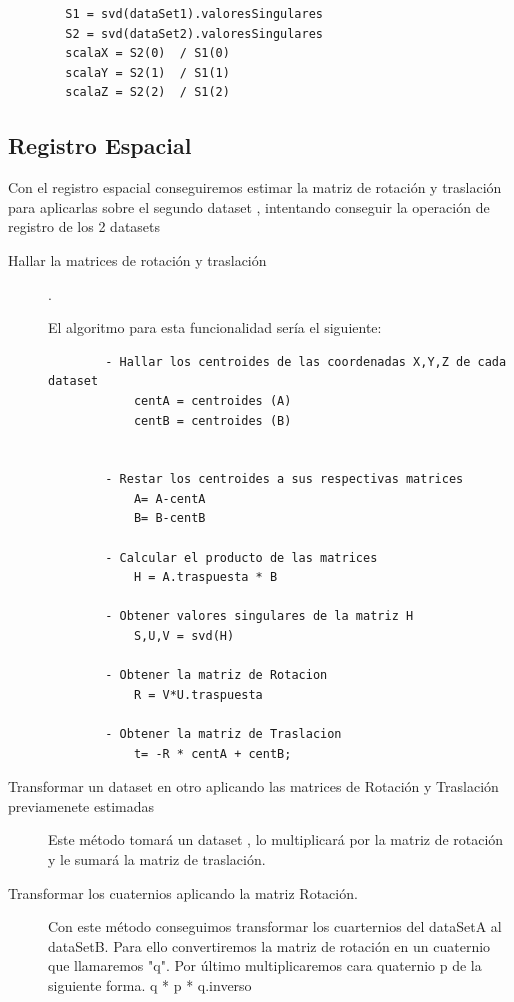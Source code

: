 	\begin{lstlisting}
		S1 = svd(dataSet1).valoresSingulares
		S2 = svd(dataSet2).valoresSingulares
		scalaX = S2(0)  / S1(0)
		scalaY = S2(1)  / S1(1)
		scalaZ = S2(2)  / S1(2)
	\end{lstlisting}

\subsection{Registro Espacial}

Con el registro espacial conseguiremos estimar la matriz de rotación y traslación para aplicarlas sobre el segundo dataset , intentando conseguir la operación de registro de los 2 datasets



\begin{description}
	\item [Hallar la matrices de rotación y traslación] .

		El algoritmo para esta funcionalidad sería el siguiente:
        \begin{lstlisting}
        - Hallar los centroides de las coordenadas X,Y,Z de cada dataset
        	centA = centroides (A)
        	centB = centroides (B)
        

        - Restar los centroides a sus respectivas matrices
          	A= A-centA
          	B= B-centB
        
        - Calcular el producto de las matrices
        	H = A.traspuesta * B

        - Obtener valores singulares de la matriz H
        	S,U,V = svd(H)
        
        - Obtener la matriz de Rotacion
          	R = V*U.traspuesta

        - Obtener la matriz de Traslacion
        	t= -R * centA + centB;  
        \end{lstlisting}

	\item[Transformar un dataset en otro aplicando las matrices de Rotación y Traslación previamenete estimadas]

		Este método tomará un dataset , lo multiplicará por la matriz de rotación y le sumará la matriz de traslación.

	\item[Transformar los cuaternios aplicando la matriz Rotación.]

		Con este método conseguimos transformar los cuarternios del dataSetA al dataSetB.
		Para ello convertiremos la matriz de rotación en un cuaternio que llamaremos "q".
		Por último multiplicaremos cara quaternio p de la siguiente forma.
		  q * p * q.inverso 


\end{description}
